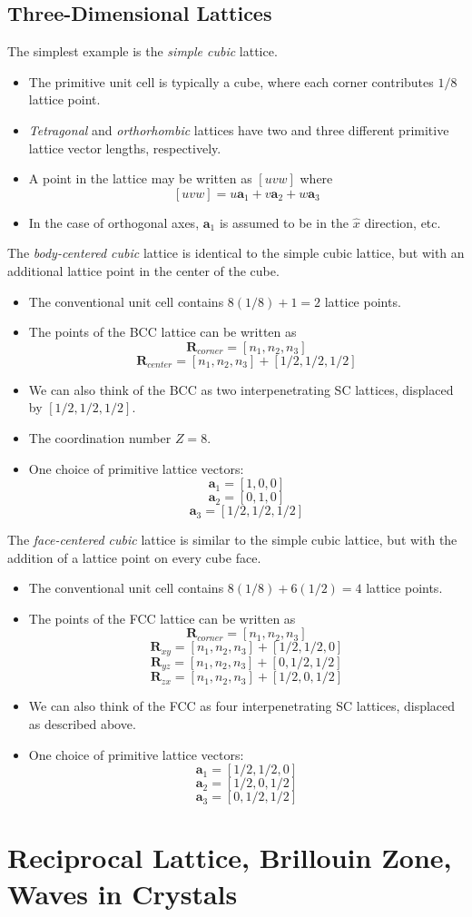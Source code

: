 \documentclass[10pt]{article}
\begin{document}
\subsection{Three-Dimensional Lattices}
The simplest example is the \emph{simple cubic} lattice.
\begin{itemize}
  \item The primitive unit cell is typically a cube, where each corner contributes $1/8$ lattice point.
  \item \emph{Tetragonal} and \emph{orthorhombic} lattices have two and three different primitive lattice
  vector lengths, respectively.
  \item A point in the lattice may be written as $[uvw]$ where
  $$[uvw] =  u\textbf{a}_{1} + v\textbf{a}_2 + w\textbf{a}_{3}$$
  \item In the case of orthogonal axes, $\textbf{a}_{1}$ is assumed to be in the $\hat{x}$ direction, etc.
\end{itemize}

The \emph{body-centered cubic} lattice is identical to the simple cubic lattice, but with an additional
lattice point in the center of the cube.
\begin{itemize}
  \item The conventional unit cell contains $8(1/8) + 1 = 2$ lattice points.
  \item The points of the BCC lattice can be written as
  $$\textbf{R}_{corner} = [n_{1}, n_{2}, n_{3}]$$
  $$\textbf{R}_{center} = [n_{1}, n_{2}, n_{3}] + [1/2, 1/2, 1/2]$$
  \item We can also think of the BCC as two interpenetrating SC lattices, displaced by $[1/2, 1/2, 1/2]$.
  \item The coordination number $Z = 8$.
  \item One choice of primitive lattice vectors:
  $$\textbf{a}_{1} = [1, 0, 0]$$
  $$\textbf{a}_{2} = [0, 1, 0]$$
  $$\textbf{a}_{3} = [1/2, 1/2, 1/2]$$

\end{itemize}

The \emph{face-centered cubic} lattice is similar to the simple cubic lattice, but with the addition of a
lattice point on every cube face.
\begin{itemize}
\item The conventional unit cell contains $8(1/8) + 6(1/2) = 4$ lattice points.
\item The points of the FCC lattice can be written as
$$\textbf{R}_{corner} = [n_{1}, n_{2}, n_{3}]$$
$$\textbf{R}_{xy} = [n_{1}, n_{2}, n_{3}] + [1/2, 1/2, 0]$$
$$\textbf{R}_{yz} = [n_{1}, n_{2}, n_{3}] + [0, 1/2, 1/2]$$
$$\textbf{R}_{zx} = [n_{1}, n_{2}, n_{3}] + [1/2, 0, 1/2]$$
\item We can also think of the FCC as four interpenetrating SC lattices, displaced as described above.
\item One choice of primitive lattice vectors:
$$\textbf{a}_{1} = [1/2, 1/2, 0]$$
$$\textbf{a}_{2} = [1/2, 0, 1/2]$$
$$\textbf{a}_{3} = [0, 1/2, 1/2]$$
\end{itemize}

\section{Reciprocal Lattice, Brillouin Zone, Waves in Crystals}
\end{document}
